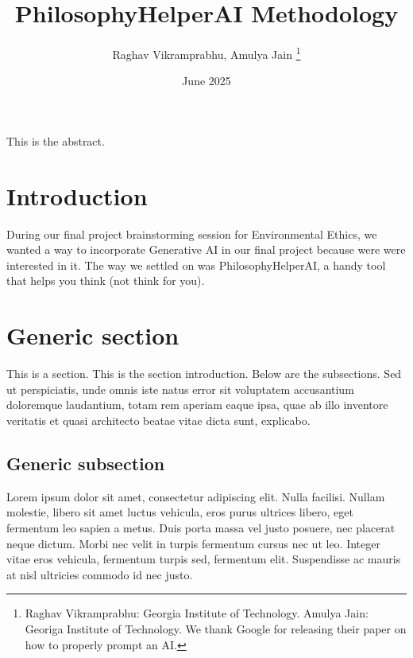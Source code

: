 \documentclass[letterpaper,11pt,leqno]{article}
\newcommand{\bib}{bibliography.bib}
\begin{document}
\title{PhilosophyHelperAI Methodology}

\author{Raghav Vikramprabhu, Amulya Jain
%
\thanks{Raghav Vikramprabhu: Georgia Institute of Technology. Amulya Jain: Georiga Institute of Technology. We thank Google for releasing their paper on how to properly prompt an AI.}}

\date{June 2025}   


\begin{titlepage}
\maketitle

This is the abstract. 

\end{titlepage}


\section{Introduction}\label{s:introduction}
 
During our final project brainstorming session for Environmental Ethics, we wanted a way to incorporate Generative AI in our final project because were were interested in it. The way we settled on was PhilosophyHelperAI, a handy tool that helps you think (not think for you).


\section{Generic section}\label{s:section}

This is a section. This is the section introduction. Below are the subsections. Sed ut perspiciatis, unde omnis iste natus error sit voluptatem accusantium doloremque laudantium, totam rem aperiam eaque ipsa, quae ab illo inventore veritatis et quasi architecto beatae vitae dicta sunt, explicabo. 

\subsection{Generic subsection}

Lorem ipsum dolor sit amet, consectetur adipiscing elit. Nulla facilisi. Nullam molestie, libero sit amet luctus vehicula, eros purus ultrices libero, eget fermentum leo sapien a metus. Duis porta massa vel justo posuere, nec placerat neque dictum. Morbi nec velit in turpis fermentum cursus nec ut leo. Integer vitae eros vehicula, fermentum turpis sed, fermentum elit. Suspendisse ac mauris at nisl ultricies commodo id nec justo. 

\pagebreak


\end{document}
